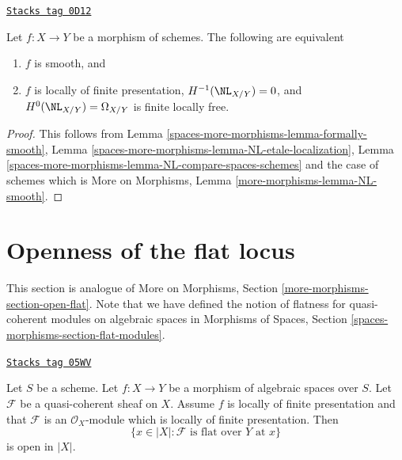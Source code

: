 \begin{lemma}[NL smooth]
\label{spaces-more-morphisms-lemma-NL-smooth}
\href{https://stacks.math.columbia.edu/tag/0D12}{\texttt{Stacks tag 0D12}}

Let $f : X \to Y$ be a morphism of schemes. The following are equivalent
\begin{enumerate}
\item $f$ is smooth, and
\item $f$ is locally of finite presentation,
$H^{-1}(\NL_{X/Y}) = 0$, and $H^0(\NL_{X/Y}) = \Omega_{X/Y}$
is finite locally free.
\end{enumerate}
\end{lemma}

\begin{proof}
This follows from
Lemma \ref{spaces-more-morphisms-lemma-formally-smooth},
Lemma \ref{spaces-more-morphisms-lemma-NL-etale-localization},
Lemma \ref{spaces-more-morphisms-lemma-NL-compare-spaces-schemes}
and the case of schemes which is
More on Morphisms, Lemma \ref{more-morphisms-lemma-NL-smooth}.
\end{proof}

\section{Openness of the flat locus}
\label{spaces-more-morphisms-section-open-flat}
This section is analogue of
More on Morphisms, Section \ref{more-morphisms-section-open-flat}.
Note that we have defined the notion of flatness for quasi-coherent
modules on algebraic spaces in
Morphisms of Spaces, Section \ref{spaces-morphisms-section-flat-modules}.

\begin{theorem}
\label{spaces-more-morphisms-theorem-openness-flatness}
\href{https://stacks.math.columbia.edu/tag/05WV}{\texttt{Stacks tag 05WV}}

Let $S$ be a scheme.
Let $f : X \to Y$ be a morphism of algebraic spaces over $S$.
Let $\mathcal{F}$ be a quasi-coherent sheaf on $X$.
Assume $f$ is locally of finite presentation and that
$\mathcal{F}$ is an $\mathcal{O}_X$-module which is
locally of finite presentation. Then
$$
\{x \in |X| : \mathcal{F}\text{ is flat over }Y\text{ at }x\}
$$
is open in $|X|$.
\end{theorem}

